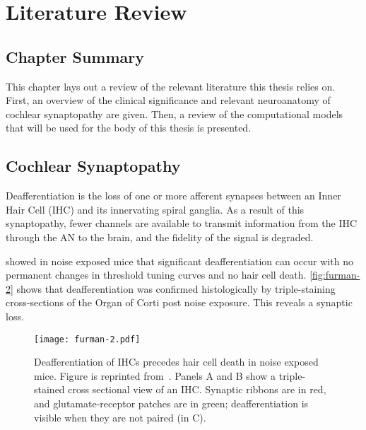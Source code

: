 \chapter{Literature Review}
\label{chapter:literaturereview}
\thispagestyle{myheadings}
\graphicspath{{2_LiteratureReview/Figures/}}
\section{Chapter Summary} %
\label{sec:review_summary}
This chapter lays out a review of the relevant literature this thesis relies on. First, an overview of the clinical significance and relevant neuroanatomy of cochlear synaptopathy are given.  Then, a review of the computational models that will be used for the body of this thesis is presented. 

\section{Cochlear Synaptopathy} %
\label{sec:cochlear_synaptopathy}
Deafferentiation is the loss of one or more afferent synapses between an Inner Hair Cell (IHC) and its innervating spiral ganglia.  As a result of this synaptopathy, fewer channels are available to transmit information from the IHC through the AN to the brain, and the fidelity of the signal is degraded.  

\cite{Kujawa2009Adding} showed in noise exposed mice that significant deafferentiation can occur with no permanent changes in threshold tuning curves and no hair cell death. \autoref{fig:furman-2} shows that deafferentiation was confirmed histologically by triple-staining cross-sections of the Organ of Corti post noise exposure.  This reveals a synaptic loss. 

\begin{figure}[htbp]
	\centering
	\texttt{[image: furman-2.pdf]}
	\caption[Deafferentiation of Inner Hair Cells]{Deafferentiation of IHCs precedes hair cell death in noise exposed mice.  Figure is reprinted from~\cite{Furman2013NoiseInduced}.  Panels A  and B show a triple-stained cross sectional view of an IHC.  Synaptic ribbons are in red, and glutamate-receptor patches are in green; deafferentiation is visible when they are not paired (in C).  }
	\label{fig:furman-2}
\end{figure}


